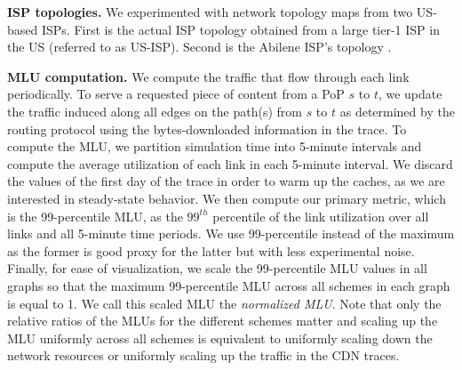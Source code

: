 




\textbf{ISP topologies.}
\label{sec:topology}
We experimented with network topology maps from two US-based ISPs. First is the actual ISP topology obtained from a large tier-1 ISP in the US (referred to as US-ISP). Second is the  Abilene ISP's topology \cite{abilene}.




{\bf MLU computation.} We compute the traffic that flow through each link periodically. To serve a requested piece of content from a PoP $s$ to $t$, we update the traffic induced along all edges on the path(s) from $s$ to $t$ as determined by the routing protocol using the bytes-downloaded information in the trace. To compute the MLU, we partition simulation time into 5-minute intervals and compute the average utilization of each link in each 5-minute interval.  We discard the values of the first day of the trace in order to warm up the caches, as we are interested in steady-state behavior. We then compute our primary metric, which is the 99-percentile MLU, as the $99^{th}$ percentile of the link utilization over all  links and all 5-minute time periods. We use 99-percentile instead of the maximum as the former is good proxy for the latter but with less experimental noise. Finally, for ease of visualization, we scale the 99-percentile MLU values in all graphs so that the maximum 99-percentile MLU across all schemes in each graph is equal to 1. We call this scaled MLU the {\em normalized MLU}. Note that only the relative ratios of the MLUs for the different schemes matter and scaling up the MLU uniformly across all schemes is equivalent to uniformly scaling down the network resources or uniformly scaling up the traffic in the CDN traces.


